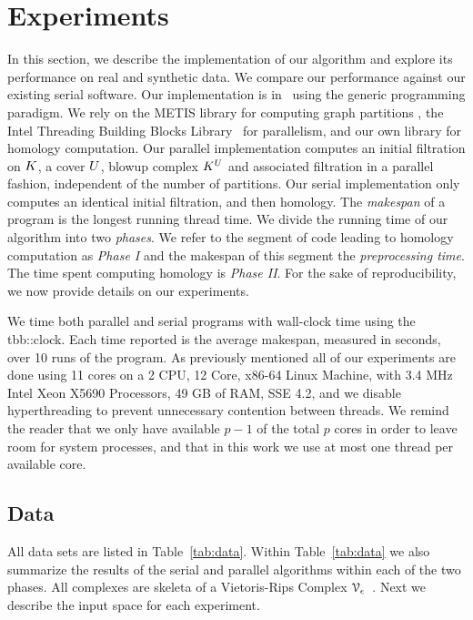 \documentclass{jocg}
\begin{document}
\section{Experiments}
\vspace{-5mm} 
\label{sec:exp}
In this section, we describe the implementation of our algorithm
and explore its performance on real and synthetic data. We compare our
performance against our existing serial software. Our implementation is in 
\cplusplus\, using the generic programming paradigm. 
We rely on the METIS library for computing graph partitions 
\cite{KaKu95}, the Intel Threading Building Blocks 
Library~\cite{IntelTBB} for parallelism, and our own
library for homology computation. Our parallel implementation computes
an initial filtration on $K$, a cover $U$, blowup complex 
$K^{U}$ and associated filtration in a parallel fashion,
independent of the number of partitions. Our serial implementation only
computes an identical initial filtration, and then homology.
The \emph{makespan} of a program is the longest running thread time.
We divide the running time of our algorithm into two \emph{phases}.
We refer to the segment of code leading to homology computation as 
\emph{Phase I} and the makespan of this segment 
the \emph{preprocessing time}. The time spent computing homology is
\emph{Phase II}.
For the sake of reproducibility, we now provide details on our experiments.

We time both parallel and serial programs with wall-clock time
using the tbb::clock. Each time reported is the average makespan,
measured in seconds, over 10 runs of the program.
As previously mentioned all of our experiments are done 
using 11 cores on a 2 CPU, 12 Core, x86-64 Linux Machine, with 3.4 MHz Intel 
Xeon X5690 Processors, 49 GB of RAM, SSE 4.2, and we disable hyperthreading 
to prevent unnecessary contention between threads. We remind the reader that we 
only have available $p-1$ of the total $p$ cores in order to leave room for 
system processes, and that in this work we use at most one thread per available 
core. 
\subsection{Data}

All data sets are listed in Table~\ref{tab:data}. 
Within Table~\ref{tab:data} we also summarize the results of 
the serial and parallel algorithms within each of the two phases.
All complexes are skeleta of a Vietoris-Rips Complex 
$\mathcal{V}_\epsilon$~\cite{z-fcv-10}. Next we describe the input space for each 
experiment. 
\end{document}
